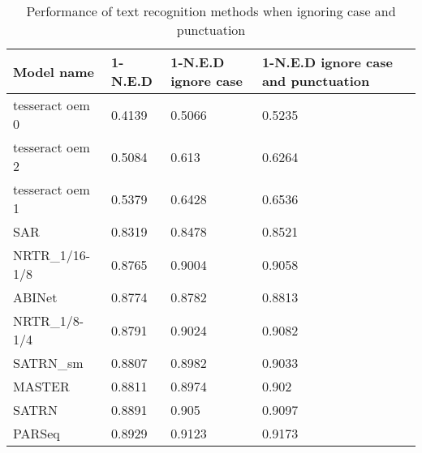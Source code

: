 \begin{table}[!ht]
    \centering
    \caption{Performance of text recognition methods when ignoring case and punctuation}
    \begin{tabular}{|l|l|l|l|}
    \hline
        Model name & 1-N.E.D & 1-N.E.D ignore case & 1-N.E.D ignore case and punctuation \\ \hline
        tesseract oem 0 & 0.4139 & 0.5066 & 0.5235 \\ \hline
        tesseract oem 2 & 0.5084 & 0.613 & 0.6264 \\ \hline
        tesseract oem 1 & 0.5379 & 0.6428 & 0.6536 \\ \hline
        SAR & 0.8319 & 0.8478 & 0.8521 \\ \hline
        NRTR\_1/16-1/8 & 0.8765 & 0.9004 & 0.9058 \\ \hline
        ABINet & 0.8774 & 0.8782 & 0.8813 \\ \hline
        NRTR\_1/8-1/4 & 0.8791 & 0.9024 & 0.9082 \\ \hline
        SATRN\_sm & 0.8807 & 0.8982 & 0.9033 \\ \hline
        MASTER & 0.8811 & 0.8974 & 0.902 \\ \hline
        SATRN & 0.8891 & 0.905 & 0.9097 \\ \hline
        PARSeq & 0.8929 & 0.9123 & 0.9173 \\ \hline
    \end{tabular}
    \label{tab:text_rec_results_ignore}
\end{table}